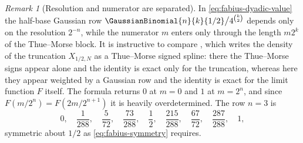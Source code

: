 \documentclass[11pt,a4paper,oneside,openany]{book}
\theoremstyle{definition}
\theoremstyle{remark}
\newtheorem{remark}[remark]{Remark}
\begin{document}
\begin{remark}[Resolution and numerator are separated]\label{rem:fabius-dyadic-architecture}
In \eqref{eq:fabius-dyadic-value} the half-base Gaussian row
$\GaussianBinomial{n}{k}{1/2}\big/4^{\binom k2}$ depends only on the resolution $2^{-n}$, while the
numerator $m$ enters only through the length $m2^k$ of the Thue--Morse block.  It is
instructive to compare , which writes the density of
the truncation $X_{1/2,N}$ as a Thue--Morse signed spline: there the Thue--Morse signs
appear alone and the identity is exact only for the truncation, whereas here they
appear weighted by a Gaussian row and the identity is exact for the limit function $F$
itself.  The formula returns $0$ at $m=0$ and $1$ at $m=2^n$, and since
$F(m/2^n)=F(2m/2^{n+1})$ it is heavily overdetermined.  The row $n=3$ is
\[
 0,\quad\frac1{288},\quad\frac5{72},\quad\frac{73}{288},\quad\frac12,
 \quad\frac{215}{288},\quad\frac{67}{72},\quad\frac{287}{288},\quad1,
\]
symmetric about $1/2$ as \eqref{eq:fabius-symmetry} requires.
\end{remark}
\end{document}
